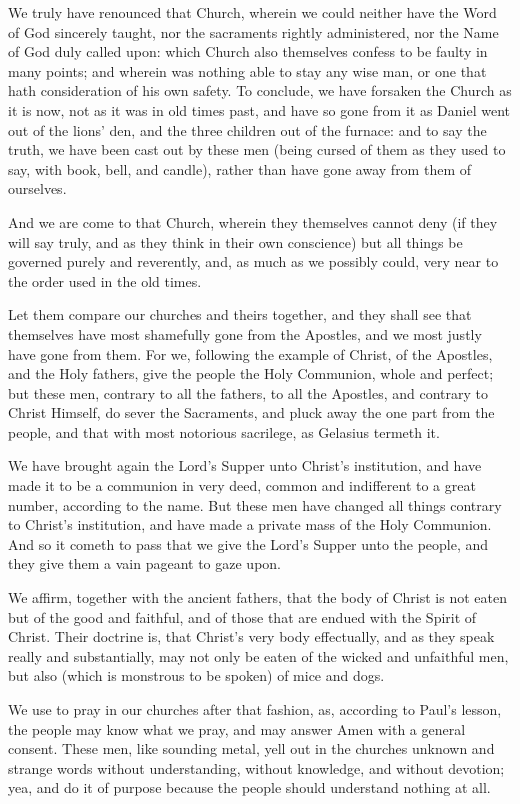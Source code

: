 We truly have renounced that Church, wherein we could neither have
the Word of God sincerely taught, nor the sacraments rightly administered,
nor the Name of God duly called upon: which Church also themselves confess
to be faulty in many points; and wherein was nothing able to stay any
wise man, or one that hath consideration of
his own safety. To conclude, we have forsaken the Church as it
is now, not as it was in old times past, and have so gone from it as
Daniel went out of the lions’ den, and the three children out
of the furnace: and to say the truth, we have been cast out by these
men (being cursed of them as they used to say, with book, bell, and
candle), rather than have gone away from them of ourselves.

And we are come to that Church, wherein they themselves cannot deny
(if they will say truly, and as they think in their own conscience)
but all things be governed purely and reverently, and, as much as we
possibly could, very near to the order used in the old times.

Let them compare our churches and theirs together, and they shall
see that themselves have most shamefully gone from the Apostles, and
we most justly have gone from them. For we, following the example
of Christ, of the Apostles, and the Holy fathers, give the people the
Holy Communion, whole and perfect; but these men, contrary to all the
fathers, to all the Apostles, and contrary to Christ Himself, do sever
the Sacraments, and pluck away the one part from the people, and that
with most notorious sacrilege, as Gelasius termeth it.

We
have brought again the Lord’s Supper unto Christ’s institution,
and have made it to be a communion in very deed, common and indifferent
to a great number, according to the name. But these men have changed
all things contrary to Christ’s institution, and have made a private
mass of the Holy Communion. And so it cometh to pass that we give
the Lord’s Supper unto the people, and they give them a vain pageant
to gaze upon.

We affirm, together with the ancient fathers, that the body of Christ
is not eaten but of the good and faithful, and of those that are endued
with the Spirit of Christ. Their doctrine is, that Christ’s
very body effectually, and as they speak really and substantially, may
not only be eaten of the wicked and unfaithful men, but also (which
is monstrous to be spoken) of mice and dogs.

We use to pray in our churches after that fashion, as, according
to Paul’s lesson, the people may know what we pray, and may answer
Amen with a general consent. These men, like sounding metal, yell
out in the churches unknown and strange words without understanding,
without knowledge, and without devotion; yea, and do it of purpose because
the people should understand nothing at all.

